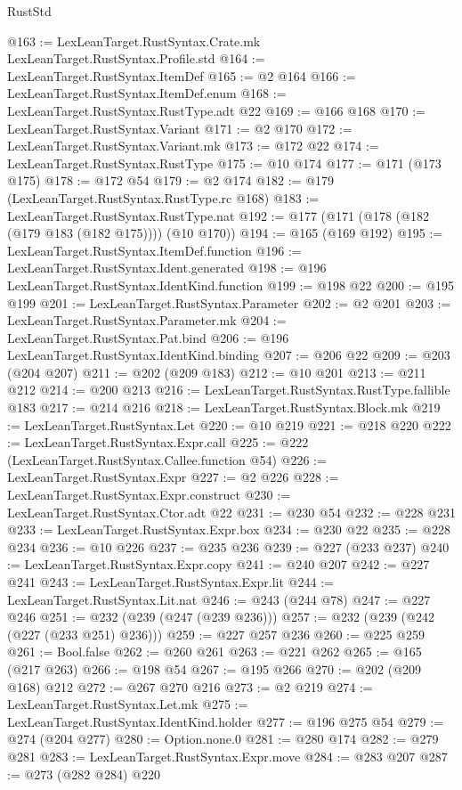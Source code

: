 \begin{lexlean}{RustStd}
\begin{coremodule}
@163 := LexLeanTarget.RustSyntax.Crate.mk LexLeanTarget.RustSyntax.Profile.std
@164 := LexLeanTarget.RustSyntax.ItemDef
@165 := @2 @164
@166 := LexLeanTarget.RustSyntax.ItemDef.enum
@168 := LexLeanTarget.RustSyntax.RustType.adt @22
@169 := @166 @168
@170 := LexLeanTarget.RustSyntax.Variant
@171 := @2 @170
@172 := LexLeanTarget.RustSyntax.Variant.mk
@173 := @172 @22
@174 := LexLeanTarget.RustSyntax.RustType
@175 := @10 @174
@177 := @171 (@173 @175)
@178 := @172 @54
@179 := @2 @174
@182 := @179 (LexLeanTarget.RustSyntax.RustType.rc @168)
@183 := LexLeanTarget.RustSyntax.RustType.nat
@192 := @177 (@171 (@178 (@182 (@179 @183 (@182 @175)))) (@10 @170))
@194 := @165 (@169 @192)
@195 := LexLeanTarget.RustSyntax.ItemDef.function
@196 := LexLeanTarget.RustSyntax.Ident.generated
@198 := @196 LexLeanTarget.RustSyntax.IdentKind.function
@199 := @198 @22
@200 := @195 @199
@201 := LexLeanTarget.RustSyntax.Parameter
@202 := @2 @201
@203 := LexLeanTarget.RustSyntax.Parameter.mk
@204 := LexLeanTarget.RustSyntax.Pat.bind
@206 := @196 LexLeanTarget.RustSyntax.IdentKind.binding
@207 := @206 @22
@209 := @203 (@204 @207)
@211 := @202 (@209 @183)
@212 := @10 @201
@213 := @211 @212
@214 := @200 @213
@216 := LexLeanTarget.RustSyntax.RustType.fallible @183
@217 := @214 @216
@218 := LexLeanTarget.RustSyntax.Block.mk
@219 := LexLeanTarget.RustSyntax.Let
@220 := @10 @219
@221 := @218 @220
@222 := LexLeanTarget.RustSyntax.Expr.call
@225 := @222 (LexLeanTarget.RustSyntax.Callee.function @54)
@226 := LexLeanTarget.RustSyntax.Expr
@227 := @2 @226
@228 := LexLeanTarget.RustSyntax.Expr.construct
@230 := LexLeanTarget.RustSyntax.Ctor.adt @22
@231 := @230 @54
@232 := @228 @231
@233 := LexLeanTarget.RustSyntax.Expr.box
@234 := @230 @22
@235 := @228 @234
@236 := @10 @226
@237 := @235 @236
@239 := @227 (@233 @237)
@240 := LexLeanTarget.RustSyntax.Expr.copy
@241 := @240 @207
@242 := @227 @241
@243 := LexLeanTarget.RustSyntax.Expr.lit
@244 := LexLeanTarget.RustSyntax.Lit.nat
@246 := @243 (@244 @78)
@247 := @227 @246
@251 := @232 (@239 (@247 (@239 @236)))
@257 := @232 (@239 (@242 (@227 (@233 @251) @236)))
@259 := @227 @257 @236
@260 := @225 @259
@261 := Bool.false
@262 := @260 @261
@263 := @221 @262
@265 := @165 (@217 @263)
@266 := @198 @54
@267 := @195 @266
@270 := @202 (@209 @168) @212
@272 := @267 @270 @216
@273 := @2 @219
@274 := LexLeanTarget.RustSyntax.Let.mk
@275 := LexLeanTarget.RustSyntax.IdentKind.holder
@277 := @196 @275 @54
@279 := @274 (@204 @277)
@280 := Option.none.{0}
@281 := @280 @174
@282 := @279 @281
@283 := LexLeanTarget.RustSyntax.Expr.move
@284 := @283 @207
@287 := @273 (@282 @284) @220

\end{coremodule}
\end{lexlean}
